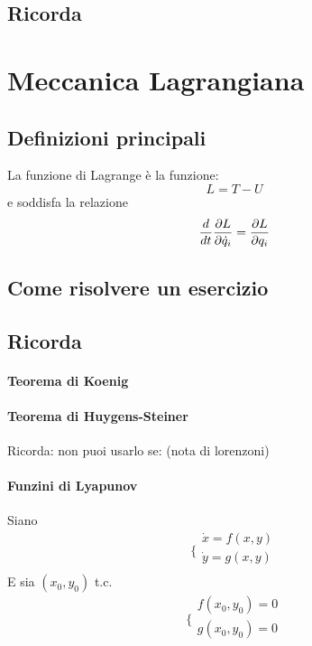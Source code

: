 \documentclass[a4paper,12pt]{article}
\begin{document}
\subsection{Ricorda}



\section{Meccanica Lagrangiana}
\subsection{Definizioni principali}
La funzione di Lagrange è la funzione:
$$ L = T - U $$
e soddisfa la relazione
$${d \over dt}\dfrac{\partial L}{\partial\dot{q}_i} = \dfrac{\partial L}{\partial q_i}$$
\subsection{Come risolvere un esercizio}

\subsection{Ricorda}
\paragraph{Teorema di Koenig}

\paragraph{Teorema di Huygens-Steiner}
Ricorda: non puoi usarlo se: (nota di lorenzoni)
\paragraph{Funzini di Lyapunov}
Siano
$$\bigg\{ \begin{array}{l}
\dot{x} = f(x,y)\\
\dot{y} = g(x,y)\\
\end{array}$$
E sia $(x_0, y_0)$ t.c.
$$\bigg\{ \begin{array}{l}
f(x_0,y_0) = 0\\
g(x_0,y_0) = 0\\
\end{array}$$
\end{document}
